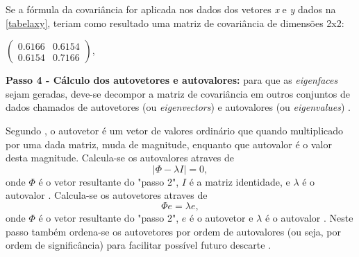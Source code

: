 



Se a fórmula da covariância for aplicada nos dados dos vetores \textit{x} e \textit{y} dados na \autoref{tabelaxy}, teriam como resultado uma matriz de covariância de dimensões 2x2:
\begin{center}
	$\begin{pmatrix} 0.6166 & 0.6154 \\ 0.6154 & 0.7166 \end{pmatrix}$,
\end{center}

\textbf{Passo 4 - Cálculo dos autovetores e autovalores:} para que as \textit{eigenfaces} sejam geradas, deve-se decompor a matriz de covariância em outros conjuntos de dados chamados de autovetores (ou \textit{eigenvectors}) e autovalores (ou \textit{eigenvalues}) \cite{geysilva}.

Segundo , o autovetor é um vetor de valores ordinário que quando multiplicado por uma dada matriz, muda de magnitude, enquanto que autovalor é o valor desta magnitude. Calcula-se os autovalores atraves de 
 \begin{equation}
 	|\Phi - \lambda I| = 0,
 \end{equation}
onde $\Phi$ é o vetor resultante do "passo 2", $I$ é a matriz identidade, e $\lambda$ é o autovalor \cite{geysilva}. Calcula-se os autovetores atraves de 
\begin{equation}
	\Phi e = \lambda e,	
\end{equation}
onde $\Phi$ é o vetor resultante do "passo 2", $e$ é o autovetor e $\lambda$ é o autovalor \cite{geysilva}.
Neste passo também ordena-se os autovetores por ordem de autovalores (ou seja, por ordem de significância) para facilitar possível futuro descarte \cite{geysilva}.

